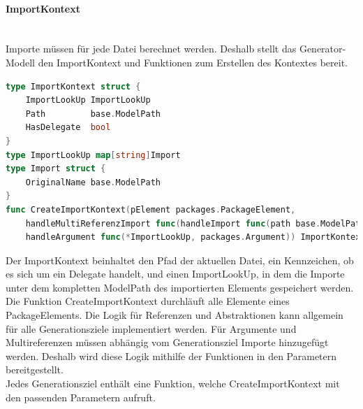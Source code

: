 \documentclass[./einleitung.tex]{subfiles}
\begin{document}
    \paragraph{ImportKontext}\mbox{}\\
    Importe müssen für jede Datei berechnet werden.
    Deshalb stellt das Generator-Modell den ImportKontext und Funktionen zum Erstellen des Kontextes bereit.
    \begin{lstlisting}[language=Go, caption=ImportKontext, label=lst:importKontext]
type ImportKontext struct {
	ImportLookUp ImportLookUp
	Path         base.ModelPath
	HasDelegate  bool
}
type ImportLookUp map[string]Import
type Import struct {
	OriginalName base.ModelPath
}
func CreateImportKontext(pElement packages.PackageElement,
	handleMultiReferenzImport func(handleImport func(path base.ModelPath), typ packages.MultiReferenzType),
	handleArgument func(*ImportLookUp, packages.Argument)) ImportKontext {}
    \end{lstlisting}
    Der ImportKontext beinhaltet den Pfad der aktuellen Datei, ein Kennzeichen, ob es sich um ein Delegate handelt, und einen ImportLookUp, in dem die Importe unter dem kompletten ModelPath des importierten Elements gespeichert werden.
    Die Funktion CreateImportKontext durchläuft alle Elemente eines PackageElements.
    Die Logik für Referenzen und Abstraktionen kann allgemein für alle Generationsziele implementiert werden.
    Für Argumente und Multireferenzen müssen abhängig vom Generationsziel Importe hinzugefügt werden.
    Deshalb wird diese Logik mithilfe der Funktionen in den Parametern bereitgestellt.\\
    Jedes Generationsziel enthält eine Funktion, welche CreateImportKontext mit den passenden Parametern aufruft.
\end{document}
